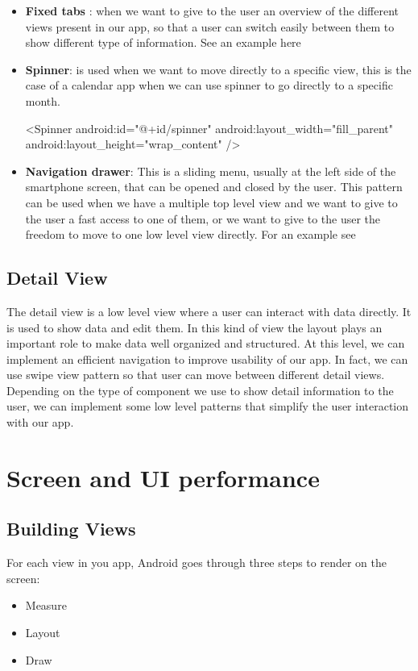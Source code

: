 \begin{itemize}
	\item \textbf{Fixed tabs} : when we want to give to
	the user an overview of the different views present in our app, so that a user can switch easily between them to show different type of information. See an example here \cite{Tamada2013}
	
	\item \textbf{Spinner}: is used when we want to move directly to a specific view, this is the case of a calendar app when we can use spinner to
	go directly to a specific month.
	
	\begin{xml}
		<Spinner
		android:id="@+id/spinner"
		android:layout_width="fill_parent"
		android:layout_height="wrap_content" />
	\end{xml}
	
	
	\item \textbf{Navigation drawer}: This is a sliding menu, usually at the left side of the
	smartphone screen, that can be opened and closed by the user. This pattern can be used when we have a multiple top level view
	and we want to give to the user a fast access to one of them, or we want to give to the user the freedom to move to one low level
	view directly. For an example see  \cite{Google2017a}
\end{itemize}

\subsection{Detail View}
The detail view is a low level view where a user can interact with data directly. It is used to show data and edit them. In this
kind of view the layout plays an important role to make data well organized and structured. At this level, we can implement
an efficient navigation to improve usability of our app. In fact, we can use swipe view pattern so that user can move between
different detail views. Depending on the type of component we use to show detail information to the user, we can implement
some low level patterns that simplify the user interaction with our app.


\section{Screen and UI performance}
\subsection{Building Views}
For each view in you app, Android goes through three steps to render on the screen:
\begin{itemize}
	\item Measure 
	\item Layout
	\item Draw
\end{itemize}


